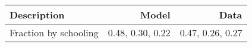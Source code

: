 \begin{tabular}{lrr}
\hline
Description & Model  & Data  \\
\hline
Fraction by schooling & 0.48, 0.30, 0.22  & 0.47, 0.26, 0.27  \\
\hline
\end{tabular}%
